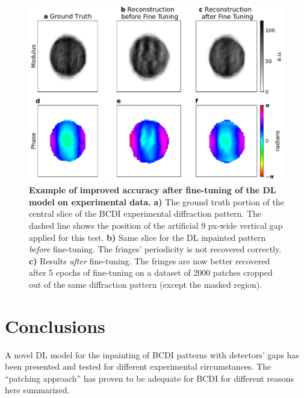 \begin{figure}[H]
    \centering
    \includegraphics[width=\textwidth]{figures/Inpainting/obj_fine_tuning.pdf}
    \caption{\textbf{Example of improved accuracy after fine-tuning of the DL model on experimental data.} \textbf{a)} 
    The ground truth portion of the central slice of the BCDI experimental diffraction pattern. The dashed line 
    shows the position of the artificial 9 px-wide vertical gap applied for this test. \textbf{b)} Same slice 
    for the DL inpainted pattern \textit{before} fine-tuning. The fringes' periodicity is not recovered correctly. 
    \textbf{c)} Results \textit{after} fine-tuning. The fringes are now better recovered after 5 epochs of fine-tuning 
    on a dataset of 2000 patches cropped out of the same diffraction pattern (except the masked region). }
    \label{fig:obj_fine_tuning}
\end{figure}
\section{Conclusions}

A novel DL model for the inpainting of BCDI patterns with detectors' gaps has been presented and tested for different 
experimental circumstances. The ``patching approach'' has proven to be adequate for BCDI for different reasons here summarized. 

